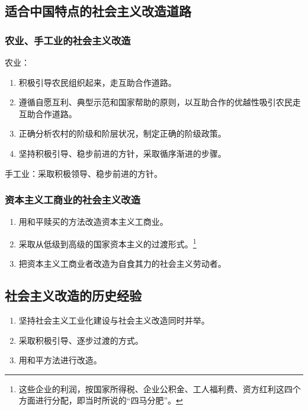     \subsection{适合中国特点的社会主义改造道路}
        \subsubsection{农业、手工业的社会主义改造}
        农业：
        \begin{enumerate}
            \item 积极引导农民组织起来，走互助合作道路。
            \item 遵循自愿互利、典型示范和国家帮助的原则，以互助合作的优越性吸引农民走互助合作道路。
            \item 正确分析农村的阶级和阶层状况，制定正确的阶级政策。
            \item 坚持积极引导、稳步前进的方针，采取循序渐进的步骤。
        \end{enumerate}

        手工业：采取积极领导、稳步前进的方针。

        \subsubsection{资本主义工商业的社会主义改造}
        \begin{enumerate}
            \item 用和平赎买的方法改造资本主义工商业。
            \item 采取从低级到高级的国家资本主义的过渡形式。\footnote{这些企业的利润，按国家所得税、企业公积金、工人福利费、资方红利这四个方面进行分配，即当时所说的“四马分肥”。}
            \item 把资本主义工商业者改造为自食其力的社会主义劳动者。
        \end{enumerate}

    \subsection{社会主义改造的历史经验}
    \begin{enumerate}
        \item 坚持社会主义工业化建设与社会主义改造同时并举。
        \item 采取积极引导、逐步过渡的方式。
        \item 用和平方法进行改造。
    \end{enumerate}


